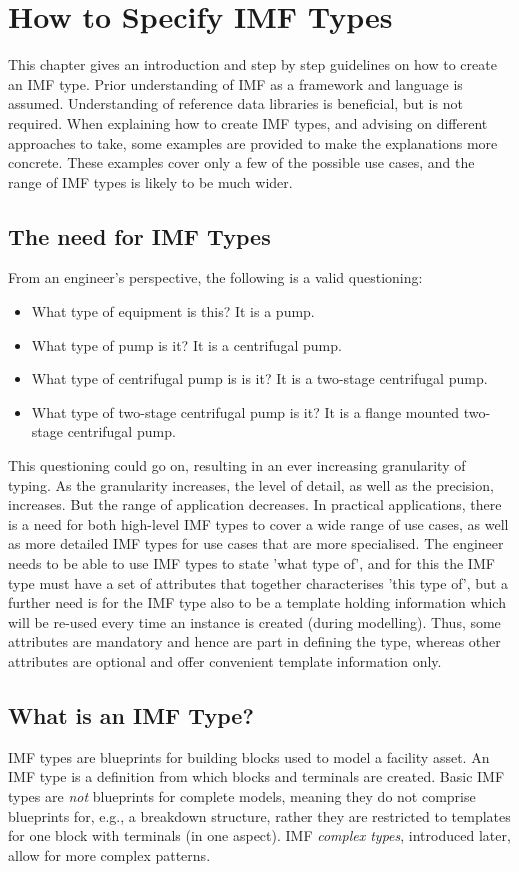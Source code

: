 \documentclass[../main.tex]{subfiles}
\begin{document}
\chapter{How to Specify IMF Types}
\label{ch:How to Specify IMF Types}
This chapter gives an introduction and step by step guidelines on
how to create an IMF type. Prior understanding of IMF as a framework and language is assumed. Understanding of
reference data libraries is beneficial, but is not required. When explaining how to create IMF types, and advising on
different approaches to take, some examples are provided to make the explanations more concrete. These examples cover
only a few of the possible use cases, and the range of IMF types is likely to be much wider.

\section{The need for IMF Types}
From an engineer's perspective, the following is a valid questioning:
\begin{itemize}
    \item What type of equipment is this? It is a pump.
    \item What type of pump is it? It is a centrifugal pump.
    \item What type of centrifugal pump is is it? It is a two-stage centrifugal pump.
    \item What type of two-stage centrifugal pump is it? It is a flange mounted two-stage centrifugal pump.
\end{itemize}
This questioning could go on, resulting in an ever increasing granularity of typing. As the granularity increases, the level of detail, as well as the precision, increases. But the range of application decreases. In practical applications, there is a need for both high-level IMF types to cover a wide range of use cases, as well as more detailed IMF types for use cases that are more specialised.
The engineer needs to be able to use IMF types to state 'what type of', and for this the IMF type must have a set of attributes that together characterises 'this type of', but a further need is for the IMF type also to be a template holding information which will be re-used every time an instance is created (during modelling). Thus, some attributes are mandatory and hence are part in defining the type, whereas other attributes are optional and offer convenient template information only.


\section{What is an IMF Type?}
IMF types are blueprints for building blocks used to model a facility asset. An IMF type
is a definition from which blocks and terminals are created. 
Basic IMF types are \textit{not} blueprints for complete models, meaning they do not comprise blueprints for, e.g., a breakdown structure, rather they are restricted to templates for one block with terminals (in one aspect). IMF \textit{complex types}, introduced later, allow for more complex patterns.
\end{document}
